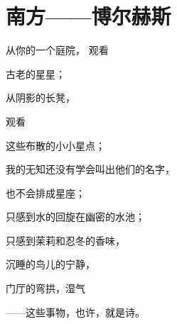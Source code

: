 \section{南方——博尔赫斯}

从你的一个庭院， 观看

古老的星星；

从阴影的长凳，

观看

这些布散的小小星点；

我的无知还没有学会叫出他们的名字，

也不会排成星座；

只感到水的回旋在幽密的水池；

只感到茉莉和忍冬的香味，

沉睡的鸟儿的宁静，

门厅的弯拱，湿气

——这些事物，也许，就是诗。

